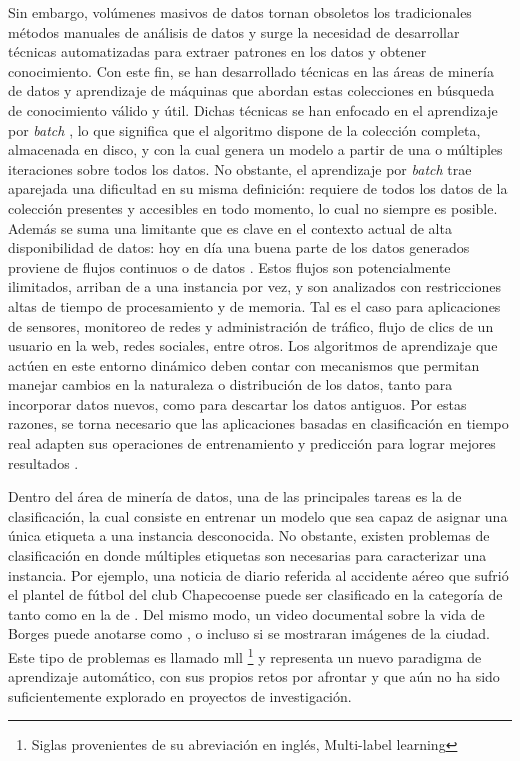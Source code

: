 Sin embargo, volúmenes masivos de datos tornan obsoletos los tradicionales
métodos manuales de análisis de datos y surge la necesidad de desarrollar
técnicas automatizadas para extraer patrones en los datos y obtener
conocimiento. Con este fin, se han desarrollado técnicas en las áreas de minería
de datos y aprendizaje de máquinas que abordan estas colecciones en búsqueda de
conocimiento válido y útil. Dichas técnicas se han enfocado en el aprendizaje
por \textit{batch} \cite{gama_knowledge_2010}, lo que significa que el algoritmo
dispone de la colección completa, almacenada en disco, y con la cual genera un
modelo a partir de una o múltiples iteraciones sobre todos los datos. No
obstante, el aprendizaje por \textit{batch} trae aparejada una dificultad en su
misma definición: requiere de todos los datos de la colección presentes y
accesibles en todo momento,  lo cual no siempre es posible. Además se suma una
limitante que es clave en el contexto actual de alta disponibilidad de datos:
hoy en día una buena parte de los datos generados proviene de flujos continuos o
 de datos \cite{bifet_big_2014}. Estos flujos son
potencialmente ilimitados, arriban de a una instancia por vez, y son analizados
con restricciones altas de tiempo de procesamiento y de memoria.  Tal es el caso
para aplicaciones de sensores, monitoreo de redes y administración de tráfico,
flujo de clics de un usuario en la web, redes sociales, entre otros.  Los
algoritmos de aprendizaje que actúen en este entorno dinámico deben contar con
mecanismos que permitan manejar cambios en la naturaleza o distribución de los
datos, tanto para incorporar datos nuevos, como para descartar los datos
antiguos. Por estas razones, se torna necesario que las aplicaciones basadas en
clasificación en tiempo real adapten sus operaciones de entrenamiento y
predicción para lograr mejores resultados \cite{sousa_multi-label_2018}.

Dentro del área de minería de datos, una de las principales tareas es la de
clasificación, la cual consiste en entrenar un modelo que sea capaz de asignar
una única etiqueta a una instancia desconocida. No obstante, existen problemas
de clasificación en donde múltiples etiquetas son necesarias para caracterizar
una instancia. Por ejemplo, una noticia de diario referida al accidente aéreo
que sufrió el plantel de fútbol del club Chapecoense puede ser clasificado en la
categoría de  tanto como en la de . Del
mismo modo, un video documental sobre la vida de Borges puede anotarse como
,  o incluso  si
se mostraran imágenes de la ciudad. Este tipo de problemas es llamado
\acrfull{mll} \footnote{Siglas provenientes de su abreviación en inglés,
Multi-label learning} y representa un nuevo paradigma de aprendizaje automático,
con sus propios retos por afrontar y que aún no ha sido suficientemente
explorado en proyectos de investigación. 

